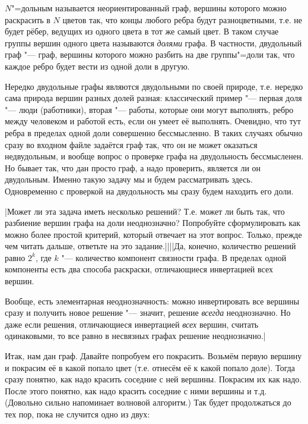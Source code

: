 $N$"=дольным называется неориентированный граф, вершины которого можно раскрасить в $N$ цветов так, что концы любого 
ребра будут разноцветными, т.е. не будет рёбер, ведущих из одного цвета в тот же самый цвет. В 
таком случае группы вершин одного цвета называются \textit{долями} графа. В частности, двудольный 
граф "--- граф, вершины которого можно разбить на две группы"=доли так, что каждое ребро будет 
вести из одной доли в другую.

Нередко двудольные графы являются двудольными по 
своей природе, т.е. нередко сама природа вершин разных долей разная: классический пример "--- 
первая доля "--- люди (работники), вторая "--- работы, которые они могут выполнять, ребро между 
человеком и работой есть, если он умеет её выполнять. Очевидно, что тут ребра в пределах одной доли 
совершенно бессмысленно. В таких случаях обычно сразу во входном файле задаётся граф так, что он не 
может оказаться недвудольным, и вообще вопрос о проверке графа на двудольность бессмысленен. Но 
бывает так, что дан просто граф, а надо проверить, является ли он двудольным. Именно такую задачу мы 
и будем рассматривать здесь. Одновременно с проверкой на двудольность мы сразу будем находить его 
доли. 

\task|Может ли эта задача иметь несколько решений? Т.е. может ли быть так, что 
разбиение вершин графа на доли неоднозначно? Попробуйте сформулировать как можно более простой 
критерий, который отвечает на этот вопрос. Только, прежде чем читать дальше, ответьте на это 
задание.||||Да, конечно, количество решений равно $2^k$, где $k$ "--- количество компонент связности графа.
В пределах одной компоненты есть два способа раскраски, отличающиеся инвертацией всех вершин. 

Вообще, есть элементарная неоднозначность: можно инвертировать все вершины сразу и получить новое решение "---
значит, решение \textit{всегда} неоднозначно. Но даже если решения, отличающиеся инвертацией \textit{всех} вершин, 
считать одинаковыми, то все равно в несвязных графах решение неоднозначно.|\label{ambigousbi}

Итак, нам дан граф. Давайте попробуем его покрасить. Возьмём первую вершину и покрасим её в какой 
попало цвет (т.е. отнесём её к какой попало доле). Тогда сразу понятно, как надо красить соседние с 
ней вершины. Покрасим их как надо. После этого понятно, как надо красить соседние с ними вершины и 
т.д. (Довольно сильно напоминает волновой алгоритм.) Так будет продолжаться до тех пор, пока не 
случится одно из двух:

